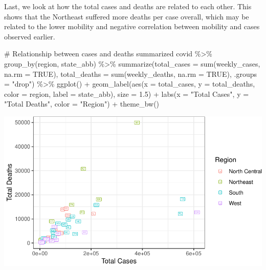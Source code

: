 \documentclass[
  letterpaper,
]{latex/krantz}
\makeatletter
\newenvironment{Shaded}{\begin{snugshade}}{\end{snugshade}}
\newcommand{\AttributeTok}[1]{\textcolor[rgb]{0.40,0.45,0.13}{#1}}
\newcommand{\CommentTok}[1]{\textcolor[rgb]{0.37,0.37,0.37}{#1}}
\newcommand{\ConstantTok}[1]{\textcolor[rgb]{0.56,0.35,0.01}{#1}}
\newcommand{\FloatTok}[1]{\textcolor[rgb]{0.68,0.00,0.00}{#1}}
\newcommand{\FunctionTok}[1]{\textcolor[rgb]{0.28,0.35,0.67}{#1}}
\newcommand{\NormalTok}[1]{\textcolor[rgb]{0.00,0.23,0.31}{#1}}
\newcommand{\SpecialCharTok}[1]{\textcolor[rgb]{0.37,0.37,0.37}{#1}}
\newcommand{\StringTok}[1]{\textcolor[rgb]{0.13,0.47,0.30}{#1}}
\newenvironment{kframe}{%
\medskip{}
\setlength{\fboxsep}{.8em}
 \def\at@end@of@kframe{}%
 \ifinner\ifhmode%
  \def\at@end@of@kframe{\end{minipage}}%
  \begin{minipage}{\columnwidth}%
 \fi\fi%
 \def\FrameCommand##1{\hskip\@totalleftmargin \hskip-\fboxsep
 \colorbox{shadecolor}{##1}\hskip-\fboxsep
     \hskip-\linewidth \hskip-\@totalleftmargin \hskip\columnwidth}%
 \MakeFramed {\advance\hsize-\width
   \@totalleftmargin\z@ \linewidth\hsize
   \@setminipage}}%
 {\par\unskip\endMakeFramed%
 \at@end@of@kframe}
\renewenvironment{Shaded}{\begin{kframe}}{\end{kframe}}
\makeatother
\begin{document}
Last, we look at how the total cases and deaths are related to each
other. This shows that the Northeast suffered more deaths per case
overall, which may be related to the lower mobility and negative
correlation between mobility and cases observed earlier.

\begin{Shaded}
\begin{Highlighting}[]
\CommentTok{\# Relationship between cases and deaths summarized}
\NormalTok{covid }\SpecialCharTok{\%\textgreater{}\%}
  \FunctionTok{group\_by}\NormalTok{(region, state\_abb) }\SpecialCharTok{\%\textgreater{}\%}
  \FunctionTok{summarize}\NormalTok{(}\AttributeTok{total\_cases =} \FunctionTok{sum}\NormalTok{(weekly\_cases, }\AttributeTok{na.rm =} \ConstantTok{TRUE}\NormalTok{),}
            \AttributeTok{total\_deaths =} \FunctionTok{sum}\NormalTok{(weekly\_deaths, }\AttributeTok{na.rm =} \ConstantTok{TRUE}\NormalTok{),}
            \AttributeTok{.groups =} \StringTok{"drop"}\NormalTok{) }\SpecialCharTok{\%\textgreater{}\%}
\FunctionTok{ggplot}\NormalTok{() }\SpecialCharTok{+} 
  \FunctionTok{geom\_label}\NormalTok{(}\FunctionTok{aes}\NormalTok{(}\AttributeTok{x =}\NormalTok{ total\_cases, }\AttributeTok{y =}\NormalTok{ total\_deaths, }\AttributeTok{color =}\NormalTok{ region,}
                 \AttributeTok{label =}\NormalTok{ state\_abb), }\AttributeTok{size =} \FloatTok{1.5}\NormalTok{) }\SpecialCharTok{+} 
  \FunctionTok{labs}\NormalTok{(}\AttributeTok{x =} \StringTok{"Total Cases"}\NormalTok{, }\AttributeTok{y =} \StringTok{"Total Deaths"}\NormalTok{, }\AttributeTok{color =} \StringTok{"Region"}\NormalTok{) }\SpecialCharTok{+}
  \FunctionTok{theme\_bw}\NormalTok{()}
\end{Highlighting}
\end{Shaded}

\begin{center}
\includegraphics[width=1\textwidth,height=\textheight]{book/cs_eda_files/figure-pdf/unnamed-chunk-17-1.pdf}
\end{center}
\end{document}
